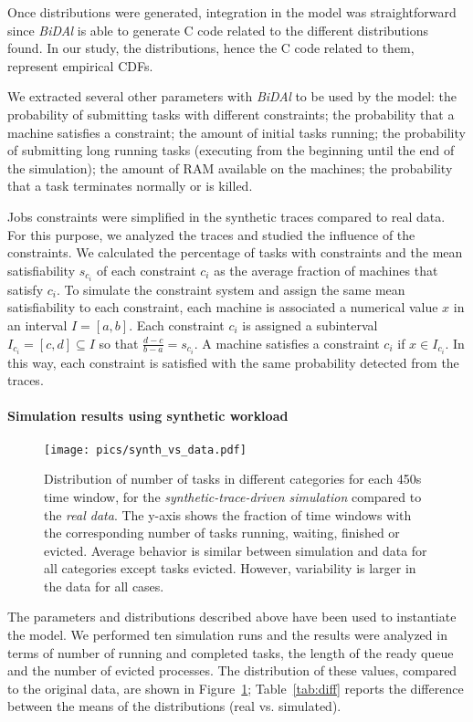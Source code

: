 \documentclass{article}
\begin{document}
Once distributions were generated, integration in the model was straightforward since \emph{BiDAl} is able to generate C code related to the different distributions found. In our study, the distributions, hence the C code related to them, represent empirical CDFs.

We extracted several other parameters with \emph{BiDAl} to be used by the model: the probability of submitting tasks with different constraints; the probability that a machine satisfies a constraint; the amount of initial tasks running; the probability of submitting long running tasks (executing from the beginning until the end of the simulation); the amount of RAM available on the machines; the probability that a task terminates normally or is killed.

Jobs constraints were simplified in the synthetic traces compared to real data. For this purpose, we analyzed the traces and studied the influence of the constraints. We calculated the percentage of tasks with constraints and the mean satisfiability $s_{c_i}$ of each constraint $c_i$ as the average fraction of machines that satisfy $c_i$. To simulate the constraint system and assign the same mean satisfiability to each constraint, each machine is associated a numerical value $x$ in an interval $I=[a,b]$. Each constraint $c_i$ is assigned a subinterval $I_{c_i}=[c,d] \subseteq I$ so that $\frac{d-c}{b-a}=s_{c_i}$. A machine satisfies a constraint $c_i$ if $x \in I_{c_i}$. In this way, each constraint is satisfied with the same probability detected from the traces.


\paragraph{Simulation results using synthetic workload}

\begin{figure}
\centering
  \texttt{[image: pics/synth\_vs\_data.pdf]}
\caption{Distribution of number of tasks in different categories for each 450s time window, for the \emph{synthetic-trace-driven simulation} compared to the \emph{real data}. The y-axis shows the fraction of time windows with the corresponding number of tasks running, waiting, finished or evicted.  Average behavior is similar between simulation and data for all categories except tasks evicted. However, variability is larger in the data for all cases. }
\label{fig:diff}       
\end{figure}


The parameters and distributions described above have been used to instantiate the model.  We performed ten simulation runs and the results were analyzed in terms of number of running and completed tasks, the length of the ready queue and the number of evicted processes. The distribution of these values, compared to the original data, are shown in Figure~\ref{fig:diff}; Table~\ref{tab:diff} reports the difference between the means of the distributions (real vs. simulated). 
\end{document}
